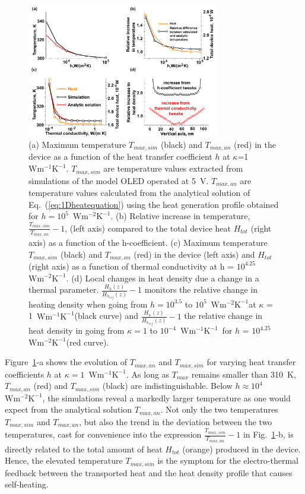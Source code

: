 \documentclass[%
9pt,
 aip,
rsi,%
 amsmath,amssymb,
preprint,%
]{revtex4-1}
\newcommand{\thermalconductivity}{$\mathrm{W m^{-1} K^{-1}}$}
\newcommand{\hcoefficient}{$\mathrm{W m^{-2} K^{-1}}$}
\begin{document}
\begin{figure}
	\centering
	\includegraphics[width=0.75\textwidth]{General_plots_5.pdf}
	\caption{(a) Maximum temperature $T_{max,sim}$ (black) and $T_{max,an}$ (red) in the device as a function of the heat transfer coefficient $h$ at $\kappa$=1~\thermalconductivity. $T_{max,sim}$ are temperature values extracted from simulations of the model OLED operated at 5~V. $T_{max,an}$ are temperature values calculated from the analytical solution of Eq.~(\ref{eq:1Dheatequation}) using the heat generation profile obtained for $h=10^5$~\hcoefficient. (b) Relative increase in temperature, $\frac{T_{max,sim}}{T_{max,an}}-1$, (left axis) compared to the total device heat $H_{tot}$ (right axis) as a function of the h-coefficient. (c) Maximum temperature $T_{max,sim}$ (black) and $T_{max,an}$ (red) in the device (left axis) and $H_{tot}$ (right axis) as a function of thermal conductivity at h = $10^{4.25}$~\hcoefficient. (d) Local changes in heat density due a change in a thermal parameter. $\frac{H_{h}(z)}{H_{h_{ref}}(z)}-1$ monitors the relative change in heating density when going from $h = 10^{3.5}$ to $10^5$~\hcoefficient at $\kappa$ = 1~\thermalconductivity (black curve) and $\frac{H_{\kappa}(z)}{H_{\kappa_{ref}}(z)}-1$ the relative change in heat density in going from
	$\kappa = 1$ to $10^{-4}$~\thermalconductivity~for $h$ = $10^{4.25}$~\hcoefficient (red curve).}
	\label{fig:final4plots}
\end{figure}

Figure~\ref{fig:final4plots}-a shows the evolution of $T_{max,an}$ and $T_{max,sim}$ for varying heat transfer coefficients $h$ at $\kappa = 1$~\thermalconductivity. 
As long as $T_{max}$ remains smaller than 310~K, $T_{max,an}$ (red) and $T_{max,sim}$ (black) are indistinguishable.
Below $h \approx 10^4$~\hcoefficient, the simulations reveal a markedly larger temperature as one would expect from the analytical solution $T_{max,an}$. 
Not only the two temperatures $T_{max,sim}$ and $T_{max,an}$, but also the trend in the deviation between the two temperatures, cast for convenience into the expression $\frac{T_{max,sim}}{T_{max,an}}-1$ in Fig.~\ref{fig:final4plots}-b, is directly related to the total amount of heat $H_{tot}$ (orange) produced in the device.
Hence, the elevated temperature $T_{max,sim}$ is the symptom for the electro-thermal feedback between the transported heat and the heat density profile that causes self-heating.
\end{document}
